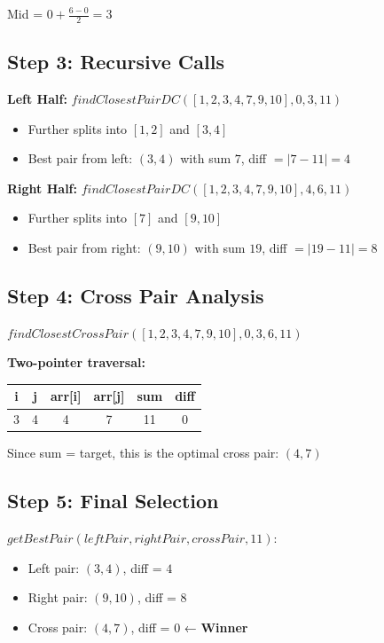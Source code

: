 \documentclass[12pt,a4paper]{article}
\begin{document}
Mid = $0 + \frac{6-0}{2} = 3$

\subsection{Step 3: Recursive Calls}

\textbf{Left Half:} $findClosestPairDC([1,2,3,4,7,9,10], 0, 3, 11)$
\begin{itemize}
    \item Further splits into $[1,2]$ and $[3,4]$
    \item Best pair from left: $(3,4)$ with sum $7$, diff $= |7-11| = 4$
\end{itemize}

\textbf{Right Half:} $findClosestPairDC([1,2,3,4,7,9,10], 4, 6, 11)$
\begin{itemize}
    \item Further splits into $[7]$ and $[9,10]$
    \item Best pair from right: $(9,10)$ with sum $19$, diff $= |19-11| = 8$
\end{itemize}

\subsection{Step 4: Cross Pair Analysis}

$findClosestCrossPair([1,2,3,4,7,9,10], 0, 3, 6, 11)$

\textbf{Two-pointer traversal:}
\begin{center}
\begin{tabular}{|c|c|c|c|c|c|}
\hline
\textbf{i} & \textbf{j} & \textbf{arr[i]} & \textbf{arr[j]} & \textbf{sum} & \textbf{diff} \\
\hline
3 & 4 & 4 & 7 & 11 & 0 \\
\hline
\end{tabular}
\end{center}

Since sum = target, this is the optimal cross pair: $(4,7)$

\subsection{Step 5: Final Selection}

$getBestPair(leftPair, rightPair, crossPair, 11)$:
\begin{itemize}
    \item Left pair: $(3,4)$, diff = $4$
    \item Right pair: $(9,10)$, diff = $8$  
    \item Cross pair: $(4,7)$, diff = $0$ ← \textbf{Winner}
\end{itemize}
\end{document}
